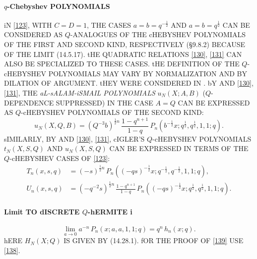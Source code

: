 \documentclass[twoside,11pt]{article}
\newcommand\half{\frac12}
\begin{document}
\paragraph{$q$-Chebyshev POLYNOMIALS} 
iN \eqref{123}, WITH $C=D=1$, THE CASES $a=b=q^{-\half}$ AND $a=b=q^\half$ CAN BE CONSIDERED 
AS $Q$-ANALOGUES OF THE cHEBYSHEV POLYNOMIALS OF THE FIRST AND SECOND KIND, RESPECTIVELY 
(\S9.8.2) BECAUSE OF THE LIMIT (14.5.17). tHE QUADRATIC RELATIONS \eqref{130}, \eqref{131} 
CAN ALSO BE SPECIALIZED TO THESE CASES. tHE DEFINITION OF THE $Q$-cHEBYSHEV POLYNOMIALS 
MAY VARY BY NORMALIZATION AND BY DILATION OF ARGUMENT. tHEY WERE CONSIDERED IN 
\cite{K18}. 
bY  AND \eqref{130}, \eqref{131}, THE {\em aL-sALAM-iSMAIL POLYNOMIALS} 
$u_N(X;A,B)$ ($Q$-DEPENDENCE SUPPRESSED) IN THE CASE $A=Q$ CAN BE EXPRESSED AS 
$Q$-cHEBYSHEV POLYNOMIALS OF THE SECOND KIND: 
\begin{equation*} 
u_N(X,Q,B)=(Q^{-3} b)^{\half n}\,\frac{1-q^{n+1}}{1-q}\, 
P_n(b^{-\half}x;q^\half,q^\half,1,1;q). 
\end{equation*} 
sIMILARLY, BY \cite[(5.4), (5.1), (5.3)]{k19} AND \eqref{130}, \eqref{131}, cIGLER'S $Q$-cHEBYSHEV 
POLYNOMIALS $t_N(X,S,Q)$ AND $u_N(X,S,Q)$ 
CAN BE EXPRESSED IN TERMS OF THE $Q$-cHEBYSHEV CASES OF \eqref{123}: 
\begin{align*} 
T_n(x,s,q)&=(-s)^{\half n}\,P_n((-qs)^{-\half} x;q^{-\half},q^{-\half},1,1;q),\\ 
U_n(x,s,q)&=(-q^{-2}s)^{\half n}\,\frac{1-q^{n+1}}{1-q}\, 
P_n((-qs)^{-\half} x;q^{\half},q^{\half},1,1;q). 
\end{align*} 
% 
\paragraph{Limit TO dISCRETE $Q$-hERMITE i} 
\begin{equation} 
\lim_{a\to0} a^{-n}\,P_n(x;a,a,1,1;q)=q^n\,h_n(x;q). 
\label{139} 
\end{equation} 
hERE $H_N(X;Q)$ IS GIVEN BY (14.28.1). 
fOR THE PROOF OF \eqref{139} USE \eqref{138}. 
% 
\end{document}
